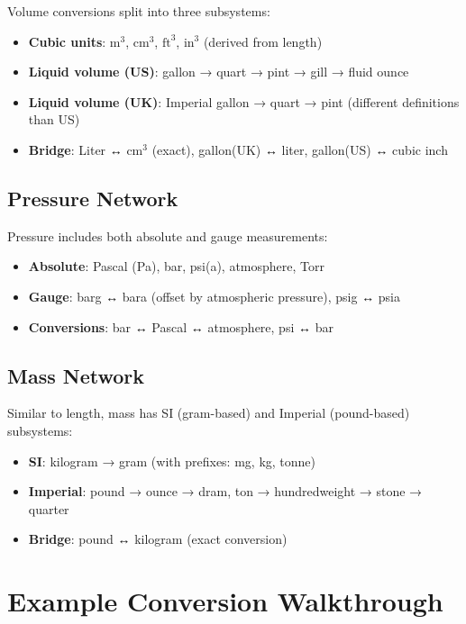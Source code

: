 \documentclass[11pt,a4paper]{report}
\begin{document}
Volume conversions split into three subsystems:
\begin{itemize}[leftmargin=*]
  \item \textbf{Cubic units}: $\text{m}^3$, $\text{cm}^3$, $\text{ft}^3$, $\text{in}^3$ (derived from length)
  \item \textbf{Liquid volume (US)}: gallon → quart → pint → gill → fluid ounce
  \item \textbf{Liquid volume (UK)}: Imperial gallon → quart → pint (different definitions than US)
  \item \textbf{Bridge}: Liter ↔ $\text{cm}^3$ (exact), gallon(UK) ↔ liter, gallon(US) ↔ cubic inch
\end{itemize}

\subsection{Pressure Network}

Pressure includes both absolute and gauge measurements:
\begin{itemize}[leftmargin=*]
  \item \textbf{Absolute}: Pascal (Pa), bar, psi(a), atmosphere, Torr
  \item \textbf{Gauge}: barg ↔ bara (offset by atmospheric pressure), psig ↔ psia
  \item \textbf{Conversions}: bar ↔ Pascal ↔ atmosphere, psi ↔ bar
\end{itemize}

\subsection{Mass Network}

Similar to length, mass has SI (gram-based) and Imperial (pound-based) subsystems:
\begin{itemize}[leftmargin=*]
  \item \textbf{SI}: kilogram → gram (with prefixes: mg, kg, tonne)
  \item \textbf{Imperial}: pound → ounce → dram, ton → hundredweight → stone → quarter
  \item \textbf{Bridge}: pound ↔ kilogram (exact conversion)
\end{itemize}

\section{Example Conversion Walkthrough}
\end{document}
